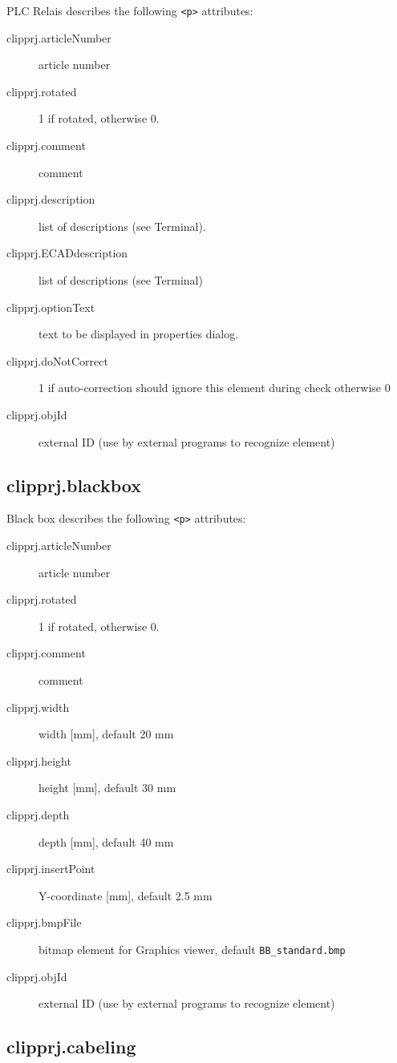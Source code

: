 \documentclass[%
	a4paper,
	oneside,
	listof=numbered,
	parskip=half,
	headsepline=true,
	footsepline=false,
	0.7headlines,
	]{scrbook}
\begin{document}
PLC Relais describes the following \verb|<p>| attributes: 

\begin{description}
	\item[clipprj.articleNumber] article number 
	\item[clipprj.rotated] 1 if rotated, otherwise 0. 
	\item[clipprj.comment] comment 
	\item[clipprj.description] list of descriptions (see Terminal). 
	\item[clipprj.ECADdescription] list of descriptions (see Terminal) 
	\item[clipprj.optionText] text to be displayed in properties dialog. 
	\item[clipprj.doNotCorrect] 1 if auto-correction should ignore this element during check otherwise 0 
	\item[clipprj.objId] external ID (use by external programs to recognize element)
\end{description}

\subsection{clipprj.blackbox}
 
Black box describes the following \verb|<p>| attributes: 

\begin{description}
	\item[clipprj.articleNumber] article number 
	\item[clipprj.rotated] 1 if rotated, otherwise 0. 
	\item[clipprj.comment] comment 
	\item[clipprj.width] width [mm], default 20 mm 
	\item[clipprj.height] height [mm], default 30 mm 
	\item[clipprj.depth] depth [mm], default 40 mm 
	\item[clipprj.insertPoint] Y-coordinate [mm], default 2.5 mm 
	\item[clipprj.bmpFile] bitmap element for Graphics viewer, default \verb|BB_standard.bmp|
	\item[clipprj.objId] external ID (use by external programs to recognize element) 
\end{description}

\subsection{clipprj.cabeling}
 
\end{document}
